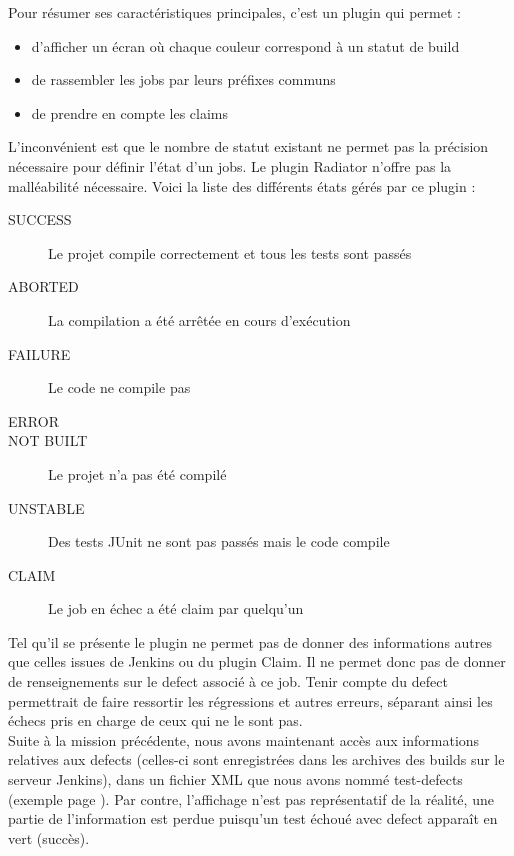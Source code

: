 Pour résumer ses caractéristiques principales, c'est un plugin qui permet :
\begin{itemize}
	\item d'afficher un écran  où chaque couleur correspond à un statut de build
	\item de rassembler les jobs par leurs préfixes communs
	\item de prendre en compte les claims
\end{itemize}

L'inconvénient est que le nombre de statut existant ne permet pas la précision nécessaire pour définir l'état d'un jobs. Le plugin Radiator n'offre pas la malléabilité nécessaire. Voici la liste des différents états gérés par ce plugin : 
\begin{description}
	\item[SUCCESS] Le projet compile correctement et tous les tests sont passés
	\item[ABORTED] La compilation a été arrêtée en cours d'exécution
	\item[FAILURE] Le code ne compile pas
	\item[ERROR]
	\item[NOT BUILT] Le projet n'a pas été compilé
	\item[UNSTABLE] Des tests JUnit ne sont pas passés mais le code compile
	\item[CLAIM] Le job en échec a été claim par quelqu'un
\end{description}



Tel qu'il se présente le plugin ne permet pas de donner des informations autres que celles issues de Jenkins ou du plugin Claim. Il ne permet donc pas de donner de renseignements sur le defect associé à ce job. Tenir compte du defect permettrait de faire ressortir les régressions et autres erreurs, séparant ainsi les échecs pris en charge de ceux qui ne le sont pas.\\
Suite à la mission précédente, nous avons maintenant accès aux informations relatives aux defects (celles-ci sont enregistrées dans les archives des builds sur le serveur Jenkins), dans un fichier XML que nous avons nommé test-defects (exemple page \pageref{testdefectxml}). Par contre, l'affichage n'est pas représentatif de la réalité, une partie de l'information est perdue puisqu'un test échoué avec defect apparaît en vert (succès).\\




